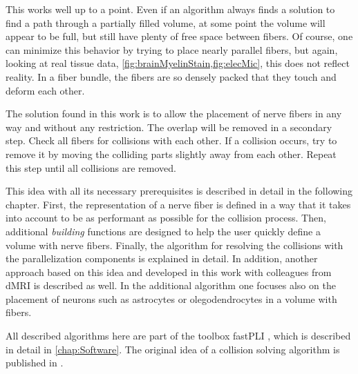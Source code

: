 This works well up to a point.
Even if an algorithm always finds a solution to find a path through a partially filled volume, at some point the volume will appear to be full, but still have plenty of free space between fibers.
Of course, one can minimize this behavior by trying to place nearly parallel fibers, but again, looking at real tissue data, \eg{} \cref{fig:brainMyelinStain,fig:elecMic}, this does not reflect reality.
In a fiber bundle, the fibers are so densely packed that they touch and deform each other.
\par
%
The solution found in this work is to allow the placement of nerve fibers in any way and without any restriction.
The overlap will be removed in a secondary step.
Check all fibers for collisions with each other.
If a collision occurs, try to remove it by moving the colliding parts slightly away from each other.
Repeat this step until all collisions are removed.
\par
%
This idea with all its necessary prerequisites is described in detail in the following chapter.
First, the representation of a nerve fiber is defined in a way that it takes into account to be as performant as possible for the collision process.
Then, additional \textit{building} functions are designed to help the user quickly define a volume with nerve fibers.
Finally, the algorithm for resolving the collisions with the parallelization components is explained in detail.
In addition, another approach based on this idea and developed in this work with colleagues from \ac{dMRI} is described as well.
In the additional algorithm one focuses also on the placement of neurons such as astrocytes or olegodendrocytes in a volume with fibers.
\par
%
All described algorithms here are part of the toolbox \ac{fastPLI} \cite{Matuschke2019, Matuschke2021}, which is described in detail in \cref{chap:Software}.
The original idea of a collision solving algorithm is published in \cite{Matuschke2019}.
%
%
%
